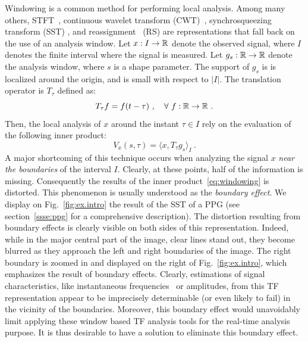 \documentclass[journal]{IEEEtran}
\begin{document}
Windowing is a common method for performing local analysis. Among many others, STFT~\cite{Flandrin:1999}, continuous wavelet transform (CWT)~\cite{Da1992}, synchrosqueezing transform (SST) \cite{Daubechies11synchrosqueezed}, and reassignment~\cite{Auger13time} (RS) are representations that fall back on the use of an analysis window. Let $x:I\to{\mathbb R}$ denote the observed signal, where $I$ denotes the finite interval where the signal is measured. Let $g_s:{\mathbb R}\to{\mathbb R}$ denote the analysis window, where $s$ is a shape parameter. The support of $g_s$ is is localized around the origin, and is small with respect to $|I|$. The translation operator is $T_\tau$ defined as:
\[
T_\tau f = f(t-\tau)\ ,\quad \forall\ f:{\mathbb R}\to{\mathbb R}\ .
\]
Then, the local analysis of $x$ around the instant $\tau\in I$ rely on the evaluation of the following inner product:
\begin{equation}
V_x(s,\tau) = \langle x, T_\tau g_s \rangle_I \ .
\label{eq:windowing}
\end{equation}
A major shortcoming of this technique occurs when analyzing the signal $x$ {\em near the boundaries} of the interval $I$. Clearly, at these points, half of the information is missing. Consequently the results of the inner product~\eqref{eq:windowing} is distorted. This phenomenon is usually understood as the \emph{boundary effect}. We display on Fig.~\ref{fig:ex.intro} the result of the SST of a PPG (see section~\ref{ssse:ppg} for a comprehensive description). The distortion resulting from boundary effects is clearly visible on both sides of this representation. Indeed, while in the major central part of the image, clear lines stand out, they become blurred as they approach the left and right boundaries of the image. The right boundary is zoomed in and displayed on the right of Fig.~\ref{fig:ex.intro}, which emphasizes the result of boundary effects. Clearly, estimations of signal characteristics, like instantaneous frequencies~\cite{Delprat92asymptotic} or amplitudes, from this TF representation appear to be imprecisely determinable (or even likely to fail) in the vicinity of the boundaries. Moreover, this boundary effect would unavoidably limit applying these window based TF analysis tools for the real-time analysis purpose. It is thus desirable to have a solution to eliminate this boundary effect.
\end{document}
